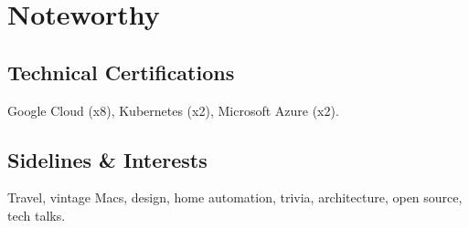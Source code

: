 \documentclass[]{cvpn}
\begin{document}
\begin{multicols}{2}
\begin{eventlist}
\end{eventlist}

\section{Noteworthy}

\subsection{Technical Certifications}
Google Cloud (x8), Kubernetes (x2), Microsoft Azure (x2).\\




\subsection{Sidelines \& Interests}
Travel, vintage Macs, design, home automation,
trivia, architecture, open source, tech talks.


\end{multicols}
\end{document}
